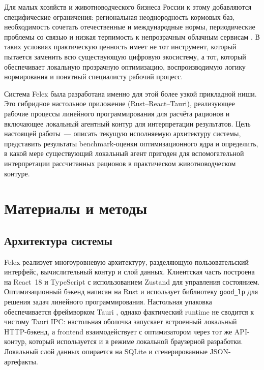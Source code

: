 \documentclass[a4paper,fleqn]{cas-sc}
\begin{document}
Для малых хозяйств и животноводческого бизнеса России к этому добавляются специфические ограничения: региональная неоднородность кормовых баз, необходимость сочетать отечественные и международные нормы, периодические проблемы со связью и низкая терпимость к непрозрачным облачным сервисам \citep{kalashnikov2003, vizh2020, aquilani2022, selvaggi2024}. В таких условиях практическую ценность имеет не тот инструмент, который пытается заменить всю существующую цифровую экосистему, а тот, который обеспечивает локальную прозрачную оптимизацию, воспроизводимую логику нормирования и понятный специалисту рабочий процесс.

Система Felex была разработана именно для этой более узкой прикладной ниши. Это гибридное настольное приложение (Rust--React--Tauri), реализующее рабочие процессы линейного программирования для расчёта рационов и включающее локальный агентный контур для интерпретации результатов. Цель настоящей работы~--- описать текущую исполняемую архитектуру системы, представить результаты benchmark-оценки оптимизационного ядра и определить, в какой мере существующий локальный агент пригоден для вспомогательной интерпретации рассчитанных рационов в практическом животноводческом контуре.

\section{Материалы и методы}\label{sec:methods}

\subsection{Архитектура системы}\label{subsec:architecture}

Felex реализует многоуровневую архитектуру, разделяющую пользовательский интерфейс, вычислительный контур и слой данных. Клиентская часть построена на React~18 и TypeScript с использованием Zustand для управления состоянием. Оптимизационный бэкенд написан на Rust \citep{rust2023} и использует библиотеку \texttt{good\_lp} \citep{goodlp2023} для решения задач линейного программирования. Настольная упаковка обеспечивается фреймворком Tauri \citep{tauri2023}, однако фактический runtime не сводится к чистому Tauri IPC: настольная оболочка запускает встроенный локальный HTTP-бэкенд, а frontend взаимодействует с оптимизатором через тот же API-контур, который используется и в режиме локальной браузерной разработки. Локальный слой данных опирается на SQLite и сгенерированные JSON-артефакты.
\end{document}
